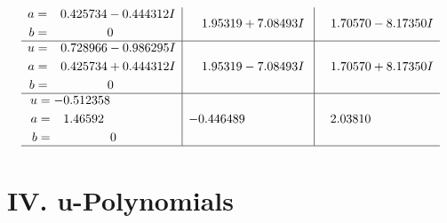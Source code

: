 \documentclass[1p]{elsarticle_modified}
\theoremstyle{definition}
\begin{document}
$$\begin{array}{c|c|c}
\begin{aligned}
a &= \phantom{-}0.425734 - 0.444312 I \\
b &= \phantom{-0.000000 } 0\end{aligned}
 & \phantom{-}1.95319 + 7.08493 I & \phantom{-}1.70570 - 8.17350 I \\ \hline\begin{aligned}
u &= \phantom{-}0.728966 - 0.986295 I \\
a &= \phantom{-}0.425734 + 0.444312 I \\
b &= \phantom{-0.000000 } 0\end{aligned}
 & \phantom{-}1.95319 - 7.08493 I & \phantom{-}1.70570 + 8.17350 I \\ \hline\begin{aligned}
u &= -0.512358\phantom{ +0.000000I} \\
a &= \phantom{-}1.46592\phantom{ +0.000000I} \\
b &= \phantom{-0.000000 } 0\end{aligned}
 & -0.446489\phantom{ +0.000000I} & \phantom{-}2.03810\phantom{ +0.000000I}\\
 \hline 
 \end{array}$$\newpage
\newpage\renewcommand{\arraystretch}{1}
\centering \section*{ IV. u-Polynomials}
\end{document}
